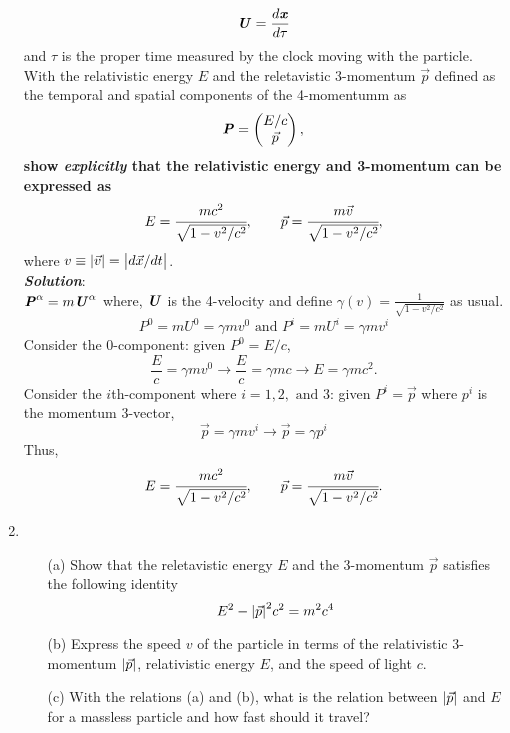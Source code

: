 \documentclass[10pt,a4paper]{article}
\theoremstyle{break}
\begin{document}
\begin{enumerate}
      \[\textbf{\textit{U}} = \frac{d\textbf{\textit{x}}}{d\tau}\]
    and $\tau$ is the proper time measured by the clock moving with the particle. With the relativistic energy $E$ and the reletavistic 3-momentum $\Vec{p}$ defined as the temporal and spatial components of the 4-momentumm as
      \[\textbf{\textit{P}} = \begin{pmatrix}
        E/c\\
        \Vec{p}
      \end{pmatrix},\]
    \textbf{show \textit{explicitly} that the relativistic energy and 3-momentum can be expressed as}
      \[E = \cfrac{mc^2}{\sqrt{1-v^2/c^2}}, \qquad \Vec{p} = \cfrac{m \Vec{v}}{\sqrt{1-v^2/c^2}},\]
    where $v \equiv \abs{\Vec{v}} = \abs{d\Vec{x}/dt}$.
    \newline\\
    \textbf{\textit{Solution}}:
    \newline\\
    $\textbf{\textit{P}}^{\alpha} = m \textbf{\textit{U}}^{\alpha}$ where, $\textbf{\textit{U}}$ is the 4-velocity and define $\gamma(v) = \frac{1}{\sqrt{1-v^2/c^2}}$ as usual.
    \[P^0 = mU^0 = \gamma mv^0\text{ and }P^i = mU^i = \gamma m v^i\]
    Consider the 0-component: given $P^0 = E/c$,
    \[\frac{E}{c} = \gamma mv^0 \to \frac{E}{c} = \gamma m c \to E = \gamma mc^2. \]
    Consider the $i$th-component where $i = 1,2, \text{ and }3$: given $P^i = \Vec{p}$ where $p^i$ is the momentum 3-vector,
    \[\Vec{p} = \gamma mv^i \to \Vec{p} = \gamma p^i\]
    Thus,
    \[E = \cfrac{mc^2}{\sqrt{1-v^2/c^2}}, \qquad \Vec{p} = \cfrac{m \Vec{v}}{\sqrt{1-v^2/c^2}}.\]
    \item
      \begin{enumerate}
        \item[(a)] Show that the reletavistic energy $E$ and the 3-momentum $\Vec{p}$ satisfies the following identity
        \[E^2 - \abs{\Vec{p}}^2c^2 = m^2c^4\]
        \item[(b)] Express the speed $v$ of the particle in terms of the relativistic 3-momentum $\abs{\Vec{p}}$, relativistic energy $E$, and the speed of light $c$.
        \item[(c)] With the relations (a) and (b), what is the relation between $\abs{\Vec{p}}$ and $E$ for a massless particle and how fast should it travel?

\end{enumerate}
\end{enumerate}
\end{document}
